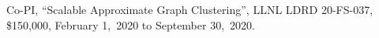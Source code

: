 \item Co-PI,
	``Scalable Approximate Graph Clustering'',
	LLNL LDRD 20-FS-037,
	\$150,000,
	February 1,~2020 to September 30,~2020.
